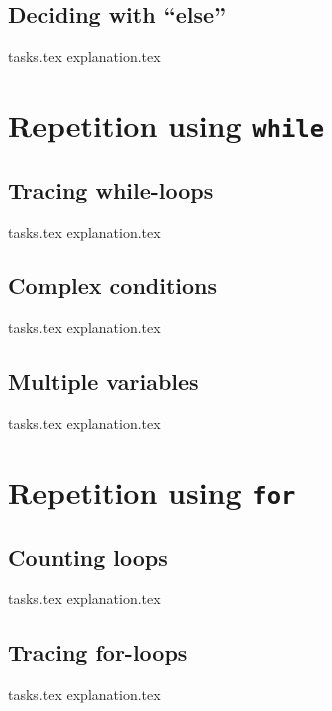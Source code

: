     \section{Deciding with ``else''}
    {tasks.tex}              \newpage
    {explanation.tex}           \newpage

    \chapter{Repetition using \texttt{while}}
    \newpage

    \section{Tracing while-loops}
    {tasks.tex}           \newpage
    {explanation.tex}        \newpage

    \section{Complex conditions}
    {tasks.tex} \newpage
    {explanation.tex} \newpage

    \section{Multiple variables}
    {tasks.tex}     \newpage
    {explanation.tex}  \newpage

    \chapter{Repetition using \texttt{for}}
    \newpage

    \section{Counting loops}
    {tasks.tex}         \newpage
    {explanation.tex}      \newpage

    \section{Tracing for-loops}
    {tasks.tex}               \newpage
    {explanation.tex}            \newpage

